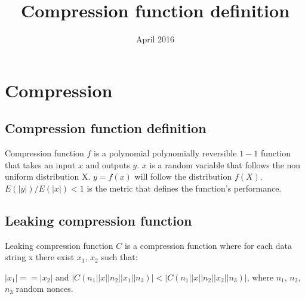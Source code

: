 \documentclass{article}
\title{Compression function definition}
\date{April 2016}
\begin{document}
\maketitle

\section*{Compression}

\subsection*{Compression function definition}
Compression function $f$ is a polynomial polynomially reversible $1-1$ function
that takes an input $x$ and outputs $y$. $x$ is a random variable that follows
the non uniform distribution X. $y = f(x)$ will follow the distribution $f(X)$.
$E(|y|) / E(|x|) < 1$ is the metric that defines the function's performance.

\subsection*{Leaking compression function}
Leaking compression function $C$ is a compression function where
for each data string x there exist $x_1$, $x_2$ such that:

$|x_1|==|x_2|$ and
$|C(n_1||x||n_2||x_1||n_3)| < |C(n_1||x||n_2||x_2||n_3)|$,
where $n_1$, $n_2$, $n_3$ random nonces.
\end{document}
